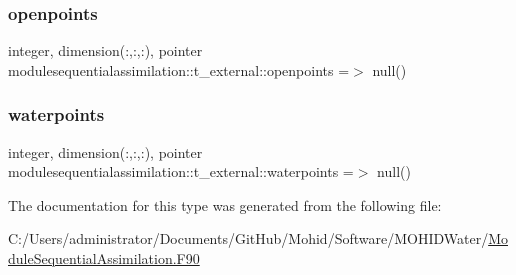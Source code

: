 \subsubsection{\texorpdfstring{openpoints}{openpoints}}
{\footnotesize\ttfamily integer, dimension(\+:,\+:,\+:), pointer modulesequentialassimilation\+::t\+\_\+external\+::openpoints =$>$ null()\hspace{0.3cm}{\ttfamily [private]}}

\mbox{\label{structmodulesequentialassimilation_1_1t__external_a86f74e7e4fc8eaea83f5c78197ba81fa}} 
\subsubsection{\texorpdfstring{waterpoints}{waterpoints}}
{\footnotesize\ttfamily integer, dimension(\+:,\+:,\+:), pointer modulesequentialassimilation\+::t\+\_\+external\+::waterpoints =$>$ null()\hspace{0.3cm}{\ttfamily [private]}}



The documentation for this type was generated from the following file\+:\begin{DoxyCompactItemize}
\item 
C\+:/\+Users/administrator/\+Documents/\+Git\+Hub/\+Mohid/\+Software/\+M\+O\+H\+I\+D\+Water/\mbox{\hyperlink{_module_sequential_assimilation_8_f90}{Module\+Sequential\+Assimilation.\+F90}}\end{DoxyCompactItemize}
